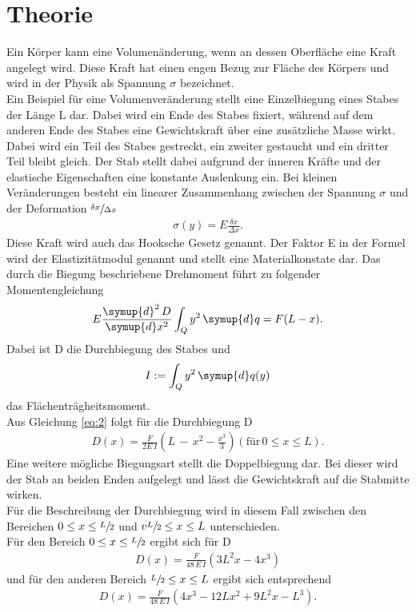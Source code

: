 \section{Theorie}\justifying
Ein Körper kann eine Volumenänderung, wenn an dessen Oberfläche eine Kraft angelegt
wird. Diese Kraft hat einen engen Bezug zur Fläche des Körpers und wird in der Physik
als Spannung $\sigma$ bezeichnet.\\
Ein Beispiel für eine Volumenveränderung stellt eine Einzelbiegung eines Stabes der Länge L dar.
Dabei wird ein Ende des Stabes fixiert, während auf dem anderen Ende des Stabes eine
Gewichtskraft über eine zusätzliche Masse wirkt. Dabei wird ein Teil des Stabes gestreckt,
ein zweiter gestaucht und ein dritter Teil bleibt gleich. Der Stab stellt dabei aufgrund der inneren
Kräfte und der elastische Eigenschaften eine konstante Auslenkung ein.
Bei kleinen Veränderungen
besteht ein linearer Zusammenhang zwischen der Spannung $\sigma$  und der Deformation $\sfrac{\delta x}{\Delta x} $
\begin{align}
    \sigma (y)=E \frac{\delta x}{\Delta x} \label{eq:1}.
\end{align}
Diese Kraft wird auch das Hooksche Gesetz genannt. Der Faktor E in der Formel wird
der Elastizitätmodul genannt und stellt eine Materialkonstate dar.
Das durch die Biegung beschriebene Drehmoment führt zu folgender Momentengleichung
\begin{align}
    E \frac{\symup{d}^2 \, D}{\symup{d}x^2}\int_Q y^2 \, \symup{d}q = F(L-x) .\label{eq:2}
\end{align}
Dabei ist D die Durchbiegung des Stabes und 
\begin{align}
    I := \int_Q y^2 \, \symup{d}q(y) \label{eq:3}
\end{align}
das Flächenträgheitsmoment. \\
Aus Gleichung \eqref{eq:2} folgt für die Durchbiegung D 
\begin{align}
    D(x)=\frac{F}{2E\,I}\left(L \, - \, x^2-\frac{x^3}{3}\right) \label{eq:4} (\text{für} \, 0\leq x \leq L).
\end{align}
Eine weitere mögliche Biegungsart stellt die Doppelbiegung dar. Bei dieser wird
der Stab an beiden Enden aufgelegt und lässt die Gewichtskraft auf die Stabmitte 
wirken. \\
Für die Beschreibung der Durchbiegung wird in diesem Fall zwischen den Bereichen
$ 0\leq x\leq \sfrac{L}{2} $ und $v\sfrac{L}{2} \leq x \leq L $ unterschieden.\\
Für den Bereich $0\leq x\leq \sfrac{L}{2}$ ergibt sich für D
\begin{align}
    D(x)=\frac{F}{48\, E\, I}(3L^2x-4x^3) \label{eq:5}
\end{align}
und für den anderen Bereich $\sfrac{L}{2} \leq x \leq L $ ergibt sich entsprechend
\begin{align}
    D(x)=\frac{F}{48\, E\, I}(4x^3 - 12Lx^2 +9L^2x-L^3) \label{eq:6}.
\end{align}

